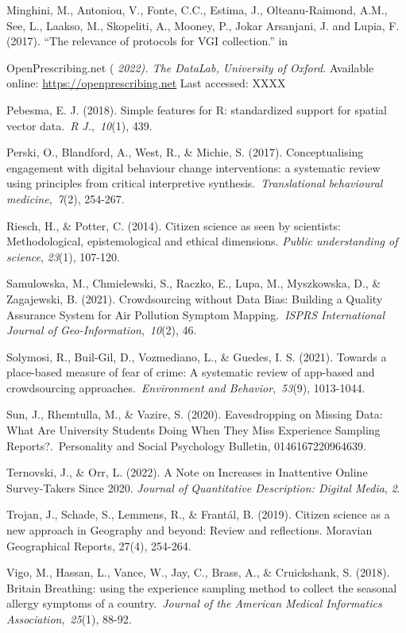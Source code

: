 \documentclass[
]{article}
\begin{document}
Minghini, M., Antoniou, V., Fonte, C.C., Estima, J., Olteanu-Raimond,
A.M., See, L., Laakso, M., Skopeliti, A., Mooney, P., Jokar Arsanjani,
J. and Lupia, F. (2017). ``The relevance of protocols for VGI
collection.'' in

OpenPrescribing.net ( \emph{2022). The DataLab, University of Oxford.}
Available online: \url{https://openprescribing.net} Last accessed: XXXX

Pebesma, E. J. (2018). Simple features for R: standardized support for
spatial vector data.~\emph{R J.},~\emph{10}(1), 439.

Perski, O., Blandford, A., West, R., \& Michie, S. (2017).
Conceptualising engagement with digital behaviour change interventions:
a systematic review using principles from critical interpretive
synthesis.~\emph{Translational behavioural medicine},~\emph{7}(2),
254-267.

Riesch, H., \& Potter, C. (2014). Citizen science as seen by scientists:
Methodological, epistemological and ethical dimensions. \emph{Public
understanding of science}, \emph{23}(1), 107-120.

Samulowska, M., Chmielewski, S., Raczko, E., Lupa, M., Myszkowska, D.,
\& Zagajewski, B. (2021). Crowdsourcing without Data Bias: Building a
Quality Assurance System for Air Pollution Symptom Mapping.~\emph{ISPRS
International Journal of Geo-Information},~\emph{10}(2), 46.

Solymosi, R., Buil-Gil, D., Vozmediano, L., \& Guedes, I. S. (2021).
Towards a place-based measure of fear of crime: A systematic review of
app-based and crowdsourcing approaches.~\emph{Environment and
Behavior},~\emph{53}(9), 1013-1044.

Sun, J., Rhemtulla, M., \& Vazire, S. (2020). Eavesdropping on Missing
Data: What Are University Students Doing When They Miss Experience
Sampling Reports?.~Personality and Social Psychology Bulletin,
0146167220964639.

Ternovski, J., \& Orr, L. (2022). A Note on Increases in Inattentive
Online Survey-Takers Since 2020. \emph{Journal of Quantitative
Description: Digital Media}, \emph{2}.

Trojan, J., Schade, S., Lemmens, R., \& Frantál, B. (2019). Citizen
science as a new approach in Geography and beyond: Review and
reflections. Moravian Geographical Reports, 27(4), 254-264.

Vigo, M., Hassan, L., Vance, W., Jay, C., Brass, A., \& Cruickshank, S.
(2018). Britain Breathing: using the experience sampling method to
collect the seasonal allergy symptoms of a country.~\emph{Journal of the
American Medical Informatics Association},~\emph{25}(1), 88-92.
\end{document}
